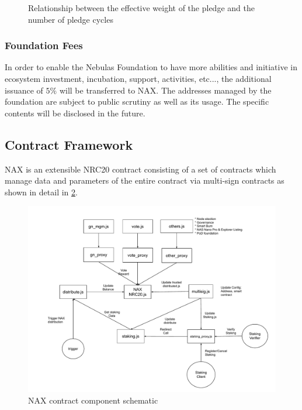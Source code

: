 \begin{figure}
\centering
    \caption{Relationship between the effective weight of the pledge and the number of pledge cycles}\label{weight}
\end{figure}

\subsubsection{Foundation Fees}
In order to enable the Nebulas Foundation to have more abilities and initiative in ecosystem investment, incubation, support, activities, etc..., the additional issuance of $5\%$ will be transferred to NAX. The addresses managed by the foundation are subject to public scrutiny as well as its usage. The specific contents will be disclosed in the future.


\subsection{Contract Framework}
NAX is an extensible NRC20 contract consisting of a set of contracts which manage data and parameters of the entire contract via multi-sign contracts as shown in detail in \ref{fig:nax_framework}.

\begin{figure}[htbp]
  \centering
    \includegraphics[width=1\textwidth]{../common/nax.pdf}
    \caption{NAX contract component schematic \label{fig:nax_framework}}
\end{figure}
